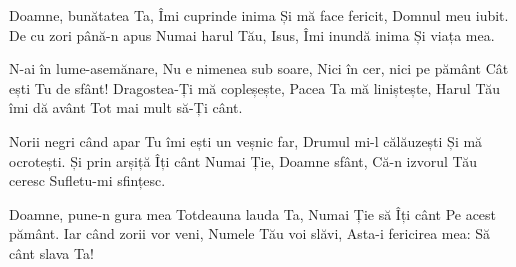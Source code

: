
\beginverse
Doamne, bunătatea Ta,
Îmi cuprinde inima
Și mă face fericit,
Domnul meu iubit.
De cu zori până-n apus
Numai harul Tău, Isus,
Îmi inundă inima
Și viața mea.
\endverse

\beginchorus
N-ai în lume-asemănare,
Nu e nimenea sub soare,
Nici în cer, nici pe pământ
Cât ești Tu de sfânt!
Dragostea-Ți mă copleșește,
Pacea Ta mă liniștește,
Harul Tău îmi dă avânt
Tot mai mult să-Ți cânt.
\endchorus

\beginverse
Norii negri când apar
Tu îmi ești un veșnic far,
Drumul mi-l călăuzești
Și mă ocrotești.
Și prin arșiță Îți cânt
Numai Ție, Doamne sfânt,
Că-n izvorul Tău ceresc
Sufletu-mi sfințesc.
\endverse

\beginverse
Doamne, pune-n gura mea
Totdeauna lauda Ta,
Numai Ție să Îți cânt
Pe acest pământ.
Iar când zorii vor veni,
Numele Tău voi slăvi,
Asta-i fericirea mea:
Să cânt slava Ta!
\endverse

\endsong